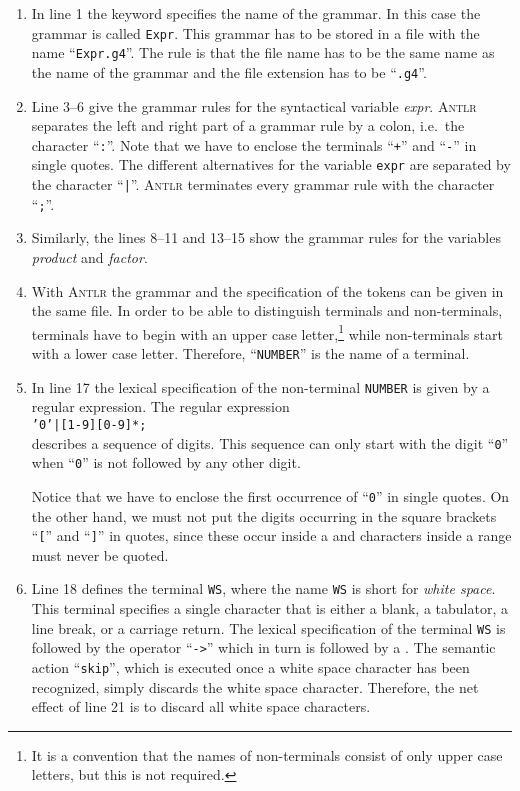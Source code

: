 \begin{enumerate}
\item In line 1 the keyword  specifies the name of the grammar.
      In this case the grammar is called \texttt{Expr}.  This grammar has to be stored in a file with the name 
      ``\texttt{Expr.g4}''.  The rule is that the file name has to be the same name as the name of the grammar
      and the file extension has to be ``\texttt{.g4}''.  
\item Line 3--6 give the grammar rules for the syntactical variable \textsl{expr}.
      \textsc{Antlr} separates the left and right part of a grammar rule by a
      colon, i.e.~the character ``\texttt{:}''.  Note that we have to enclose the 
      terminals ``\texttt{+}'' and ``\texttt{-}'' in single quotes.  The different alternatives for the variable
      \texttt{expr} are separated by the character ``\texttt{|}''.
      \textsc{Antlr} terminates every grammar rule with the character ``\texttt{;}''.
\item Similarly, the lines 8--11 and 13--15 show the grammar rules for the variables \textsl{product} and
      \textsl{factor}.   
\item With \textsc{Antlr} the grammar and the specification of the tokens can be given in the same file.
      In order to be able to distinguish terminals and non-terminals, terminals have to begin with an upper case 
      letter,\footnote
      {It is a convention that the names of non-terminals consist of only upper case letters, but this is not required.}
      while non-terminals start with a lower case letter.   Therefore, ``\texttt{NUMBER}'' is the name
      of a terminal.
\item In line 17 the lexical specification of the non-terminal \texttt{NUMBER} is given
      by a regular expression.  The regular expression
      \\[0.2cm]
      \hspace*{1.3cm}
      \texttt{'0'|[1-9][0-9]*;}
      \\[0.2cm]
      describes a sequence of digits.  This sequence can only start with the digit
      ``\texttt{0}'' when ``\texttt{0}'' is not followed by any other digit.

      Notice that we have to enclose the first occurrence of ``\texttt{0}'' in single quotes.
      On the other hand, we must not put the digits occurring in the square brackets ``\texttt{[}'' 
      and ``\texttt{]}'' in quotes, since these occur inside a  and characters inside a range
      must never be quoted.
\item Line 18 defines the terminal \texttt{WS}, where the name \texttt{WS} is short for \emph{white space}. This terminal
      specifies a single character that is either a blank, a tabulator, a line break, or a carriage return.
      The lexical specification of the terminal \texttt{WS} is followed by the operator ``\texttt{->}'' 
      which in turn is followed by a .
      The semantic action ``\texttt{skip}'', which is executed once a white space character has been recognized, 
      simply discards the white space character.  Therefore, the net effect of line 21 is to discard all white
      space characters. 


\end{enumerate}
